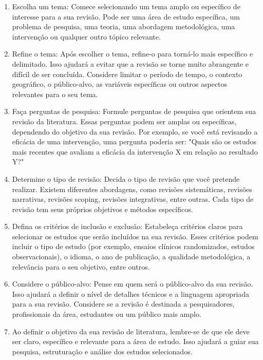 \documentclass[12pt,a4paper, brazil]{article}
\begin{document}
\begin{enumerate}
    \item Escolha um tema: Comece selecionando um tema amplo ou específico de interesse para a sua revisão. Pode ser uma área de estudo específica, um problema de pesquisa, uma teoria, uma abordagem metodológica, uma intervenção ou qualquer outro tópico relevante.
    
    \item Refine o tema: Após escolher o tema, refine-o para torná-lo mais específico e delimitado. Isso ajudará a evitar que a revisão se torne muito abrangente e difícil de ser concluída. Considere limitar o período de tempo, o contexto geográfico, o público-alvo, as variáveis específicas ou outros aspectos relevantes para o seu tema.
    
    \item Faça perguntas de pesquisa: Formule perguntas de pesquisa que orientem sua revisão da literatura. Essas perguntas podem ser amplas ou específicas, dependendo do objetivo da sua revisão. Por exemplo, se você está revisando a eficácia de uma intervenção, uma pergunta poderia ser: "Quais são os estudos mais recentes que avaliam a eficácia da intervenção X em relação ao resultado Y?"
    
    \item Determine o tipo de revisão: Decida o tipo de revisão que você pretende realizar. Existem diferentes abordagens, como revisões sistemáticas, revisões narrativas, revisões scoping, revisões integrativas, entre outras. Cada tipo de revisão tem seus próprios objetivos e métodos específicos.
    
    \item Defina os critérios de inclusão e exclusão: Estabeleça critérios claros para selecionar os estudos que serão incluídos na sua revisão. Esses critérios podem incluir o tipo de estudo (por exemplo, ensaios clínicos randomizados, estudos observacionais), o idioma, o ano de publicação, a qualidade metodológica, a relevância para o seu objetivo, entre outros.
    
    \item Considere o público-alvo: Pense em quem será o público-alvo da sua revisão. Isso ajudará a definir o nível de detalhes técnicos e a linguagem apropriada para a sua revisão. Considere se a revisão é destinada a pesquisadores, profissionais da área, estudantes ou um público mais amplo.
    
    \item Ao definir o objetivo da sua revisão de literatura, lembre-se de que ele deve ser claro, específico e relevante para a área de estudo. Isso ajudará a guiar sua pesquisa, estruturação e análise dos estudos selecionados.

\end{enumerate}
\end{document}
